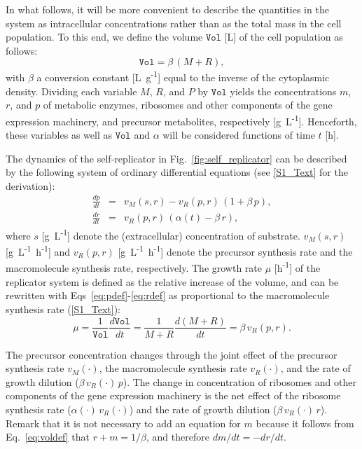In what follows, it will be more convenient to describe the quantities in the system as intracellular concentrations rather than as the total mass in the cell population.
To this end, we define the volume $\mathtt{Vol}$ [L] of the cell population as follows:
\begin{equation}
\mathtt{Vol} = \beta \, (M + R),
\label{eq:voldef}
\end{equation}
with $\beta$ a conversion constant [L~g\textsuperscript{-1}] equal to the inverse of the cytoplasmic density.
Dividing each variable $M$, $R$, and $P$ by $\mathtt{Vol}$ yields the concentrations $m$, $r$, and $p$ of metabolic enzymes, ribosomes and other components of the gene expression machinery, and precursor metabolites, respectively [g~L\textsuperscript{-1}].
Henceforth, these variables as well as $\mathtt{Vol}$ and $\alpha$ will be considered functions of time $t$ [h].

The dynamics of the self-replicator in Fig.~\ref{fig:self_replicator} can be described by the following system of ordinary differential equations (see \ref{S1_Text} for the derivation):
\begin{eqnarray}
\frac{dp}{dt} &=& v_M(s,r) - v_R(p,r) \, (1+\beta\, p), \label{eq:pdef}\\
\frac{dr}{dt} &=& v_R(p,r) \, (\alpha(t) - \beta\, r), \label{eq:rdef}
\end{eqnarray}
where $s$ [g~L\textsuperscript{-1}] denote the (extracellular) concentration of substrate.
$v_M(s,r)$ [g~L\textsuperscript{-1}~h\textsuperscript{-1}] and $v_R(p,r)$ [g~L\textsuperscript{-1}~h\textsuperscript{-1}] denote the precursor synthesis rate and the macromolecule synthesis rate, respectively.
The growth rate $\mu$ [h\textsuperscript{-1}] of the replicator system is defined as the relative increase of the volume, and can be rewritten with Eqs~\ref{eq:pdef}-\ref{eq:rdef} as proportional to the macromolecule synthesis rate (\ref{S1_Text}):
\begin{equation}\label{eq:growthrate}
\mu = \frac{1}{\mathtt{Vol}} \frac{d\mathtt{Vol}}{dt} = \frac{1}{M+R}\frac{d(M+R)}{dt} = \beta\, v_R(p,r).
\end{equation}

The precursor concentration changes through the joint effect of the precursor synthesis rate $v_M(\cdot )$, the macromolecule synthesis rate $v_R(\cdot )$, and the rate of growth dilution ($\beta\, v_R(\cdot ) \,p$).
The change in concentration of ribosomes and other components of the gene expression machinery is the net effect of the ribosome synthesis rate ($\alpha (\cdot )\, v_R (\cdot)$) and the rate of growth dilution ($\beta \, v_R(\cdot) \, r $).
Remark that it is not necessary to add an equation for $m$ because it follows from Eq.~\ref{eq:voldef} that $r + m = 1/\beta$, and therefore $dm/dt = - dr/dt$.

